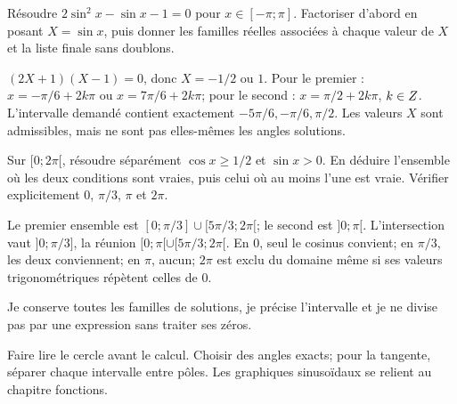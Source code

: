\label{t11s-c16-p01}
Résoudre $2\sin^2x-\sin x-1=0$ pour $x\in[-\pi;\pi]$. Factoriser d’abord en posant $X=\sin x$, puis donner les familles réelles associées à chaque valeur de $X$ et la liste finale sans doublons.
\begin{corrige}\label{sol-t11s-c16-p01}
$(2X+1)(X-1)=0$, donc $X=-1/2$ ou $1$. Pour le premier : $x=-\pi/6+2k\pi$ ou $x=7\pi/6+2k\pi$; pour le second : $x=\pi/2+2k\pi$, $k\in Z$. L’intervalle demandé contient exactement $-5\pi/6,-\pi/6,\pi/2$. Les valeurs $X$ sont admissibles, mais ne sont pas elles-mêmes les angles solutions.
\end{corrige}
\label{t11s-c16-p02}
Sur $[0;2\pi[$, résoudre séparément $\cos x\ge1/2$ et $\sin x>0$. En déduire l’ensemble où les deux conditions sont vraies, puis celui où au moins l’une est vraie. Vérifier explicitement $0$, $\pi/3$, $\pi$ et $2\pi$.
\begin{corrige}\label{sol-t11s-c16-p02}
Le premier ensemble est $[0;\pi/3]\cup[5\pi/3;2\pi[$; le second est $]0;\pi[$. L’intersection vaut $]0;\pi/3]$, la réunion $[0;\pi[\cup[5\pi/3;2\pi[$. En $0$, seul le cosinus convient; en $\pi/3$, les deux conviennent; en $\pi$, aucun; $2\pi$ est exclu du domaine même si ses valeurs trigonométriques répètent celles de $0$.
\end{corrige}

\begin{jemeteste}Je conserve toutes les familles de solutions, je précise l’intervalle et je ne divise pas par une expression sans traiter ses zéros.\end{jemeteste}
\begin{notepourlaclasse}Faire lire le cercle avant le calcul. Choisir des angles exacts; pour la tangente, séparer chaque intervalle entre pôles. Les graphiques sinusoïdaux se relient au chapitre fonctions.\end{notepourlaclasse}
